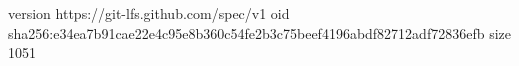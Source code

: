 version https://git-lfs.github.com/spec/v1
oid sha256:e34ea7b91cae22e4c95e8b360c54fe2b3c75beef4196abdf82712adf72836efb
size 1051
